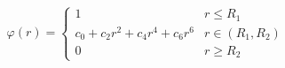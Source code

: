\documentclass[12pt]{article}
\begin{document}
\[
  \varphi(r) = 
    \begin{cases}
       1 & r \le R_1 \\
       c_0 + c_2r^2 + c_4r^4 + c_6r^6  & r \in (R_1, R_2) \\
       0 & r \ge R_2
  \end{cases}
\]
\end{document}
